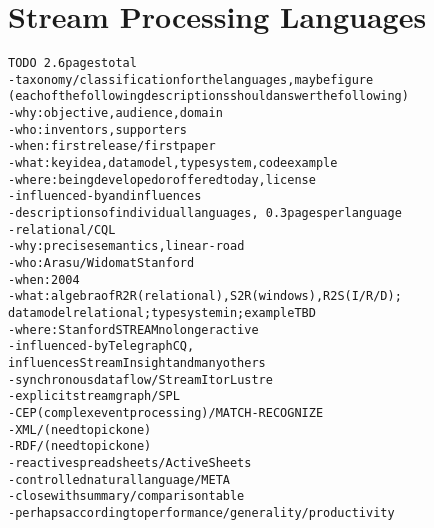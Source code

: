 \section{Stream Processing Languages}\label{sec:languages}

\begin{alltt}TODO\scriptsize ~2.6 pages total
- taxonomy/classification for the languages, maybe figure
  (each of the following descriptions should answer the following)
  - why: objective, audience, domain
  - who: inventors, supporters
  - when: first release / first paper
  - what: key idea, data model, type system, code example
  - where: being developed or offered today, license
  - influenced-by and influences
- descriptions of individual languages, ~0.3 pages per language
  - relational / CQL \cite{arasu_babu_widom_2006}
    - why: precise semantics \cite{arasu_widom_2004}, linear-road \cite{arasu_et_al_2004}
    - who: Arasu/Widom at Stanford
    - when: 2004
    - what: algebra of R2R (relational), S2R (windows), R2S (I/R/D);
      data model relational; type system in \cite{soule_et_al_2016}; example TBD
    - where: Stanford STREAM no longer active
    - influenced-by TelegraphCQ \cite{chandrasekaran_et_al_2003},
      influences StreamInsight \cite{ali_et_al_2009} and many others
  - synchronous dataflow / StreamIt \cite{thies_et_al_2002} or Lustre
  - explicit stream graph / SPL \cite{hirzel_schneider_gedik_2017} \cite{soule_et_al_2010}
  - CEP (complex event processing) / MATCH-RECOGNIZE \cite{zemke_et_al_2007} \cite{hirzel_2012}
  - XML / (need to pick one)
  - RDF / (need to pick one)
  - reactive spreadsheets / ActiveSheets \cite{vaziri_et_al_2014}
  - controlled natural language / META \cite{arnold_et_al_2016}
- close with summary/comparison table
  - perhaps according to performance/generality/productivity
\end{alltt}
